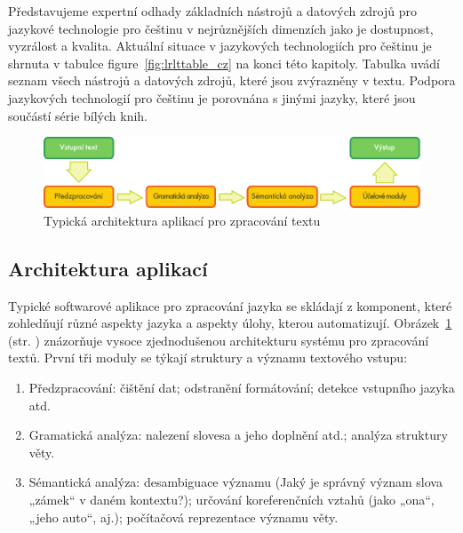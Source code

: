 \begin{multicols}{2}
Představujeme expertní odhady základních nástrojů a datových zdrojů pro jazykové technologie pro češtinu
v nejrůznějších dimenzích jako je dostupnost, vyzrálost a kvalita. Aktuální situace v jazykových technologiích pro češtinu je shrnuta v tabulce figure~\ref{fig:lrlttable_cz} na konci této kapitoly. Tabulka uvádí seznam všech nástrojů a datových zdrojů, které jsou zvýrazněny v textu. Podpora jazykových technologií pro češtinu je porovnána s jinými jazyky, které jsou součástí série bílých knih.

\begin{figure}[b]
  \center
  \includegraphics[width=\textwidth]{../_media/czech/text_processing_app_architecture}
  \caption{Typická architektura aplikací pro zpracování textu}
  \label{fig:textprocessingarch_cz}
\end{figure}

\subsection{Architektura aplikací}

Typické softwarové aplikace pro zpracování jazyka se skládají z komponent, které zohledňují různé aspekty jazyka a aspekty úlohy, kterou automatizují. Obrázek~\ref{fig:textprocessingarch_cz} (str. \pageref{fig:textprocessingarch_cz}) znázorňuje vysoce zjednodušenou architekturu systému pro zpracování textů. První tři moduly se týkají struktury a významu textového vstupu:

\begin{enumerate}
\item Předzpracování: čištění dat; odstranění formátování; detekce vstupního jazyka atd.
\item Gramatická analýza: nalezení slovesa a jeho doplnění atd.; analýza struktury věty.
\item Sémantická analýza: desambiguace významu (Jaký je správný význam slova „zámek“ v daném kontextu?); určování koreferenčních vztahů (jako „ona“, „jeho auto“, aj.); počítačová reprezentace významu věty.  \end{enumerate}


\end{multicols}
